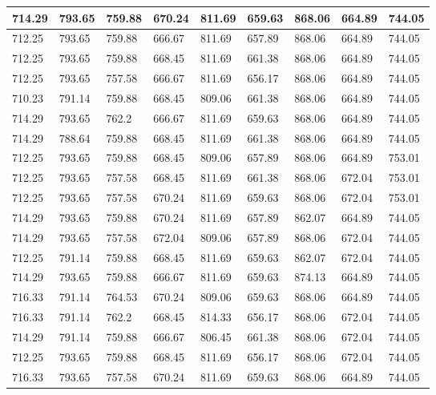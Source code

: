\begin{longtable}{|l|l|l|l|l|l|l|l|l|}
		714.29   & 793.65  & 759.88  & 670.24  & 811.69 & 659.63  & 868.06   & 664.89  & 744.05  \\ \hline
		712.25   & 793.65  & 759.88  & 666.67  & 811.69 & 657.89  & 868.06   & 664.89  & 744.05  \\ \hline
		712.25   & 793.65  & 759.88  & 668.45  & 811.69 & 661.38  & 868.06   & 664.89  & 744.05  \\ \hline
		712.25   & 793.65  & 757.58  & 666.67  & 811.69 & 656.17  & 868.06   & 664.89  & 744.05  \\ \hline
		710.23   & 791.14  & 759.88  & 668.45  & 809.06 & 661.38  & 868.06   & 664.89  & 744.05  \\ \hline
		714.29   & 793.65  & 762.2   & 666.67  & 811.69 & 659.63  & 868.06   & 664.89  & 744.05  \\ \hline
		714.29   & 788.64  & 759.88  & 668.45  & 811.69 & 661.38  & 868.06   & 664.89  & 744.05  \\ \hline
		712.25   & 793.65  & 759.88  & 668.45  & 809.06 & 657.89  & 868.06   & 664.89  & 753.01  \\ \hline
		712.25   & 793.65  & 757.58  & 668.45  & 811.69 & 661.38  & 868.06   & 672.04  & 753.01  \\ \hline
		712.25   & 793.65  & 757.58  & 670.24  & 811.69 & 659.63  & 868.06   & 672.04  & 753.01  \\ \hline
		714.29   & 793.65  & 759.88  & 670.24  & 811.69 & 657.89  & 862.07   & 664.89  & 744.05  \\ \hline
		714.29   & 793.65  & 757.58  & 672.04  & 809.06 & 657.89  & 868.06   & 672.04  & 744.05  \\ \hline
		712.25   & 791.14  & 759.88  & 668.45  & 811.69 & 659.63  & 862.07   & 672.04  & 744.05  \\ \hline
		714.29   & 793.65  & 759.88  & 666.67  & 811.69 & 659.63  & 874.13   & 664.89  & 744.05  \\ \hline
		716.33   & 791.14  & 764.53  & 670.24  & 809.06 & 659.63  & 868.06   & 664.89  & 744.05  \\ \hline
		716.33   & 791.14  & 762.2   & 668.45  & 814.33 & 656.17  & 868.06   & 672.04  & 744.05  \\ \hline
		714.29   & 791.14  & 759.88  & 666.67  & 806.45 & 661.38  & 868.06   & 672.04  & 744.05  \\ \hline
		712.25   & 793.65  & 759.88  & 668.45  & 811.69 & 656.17  & 868.06   & 672.04  & 744.05  \\ \hline
		716.33   & 793.65  & 757.58  & 670.24  & 811.69 & 659.63  & 868.06   & 664.89  & 744.05  \\ \hline

\end{longtable}
